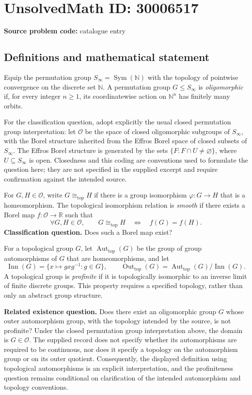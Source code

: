 \documentclass[11pt]{article}
\newcommand{\N}{\mathbb{N}}
\newcommand{\R}{\mathbb{R}}
\begin{document}
\section*{UnsolvedMath ID: 30006517}
\textbf{Source problem code:} catalogue entry
\subsection{Definitions and mathematical statement}
Equip the permutation group \(S_\infty=\operatorname{Sym}(\N)\) with the topology of pointwise convergence on the discrete set \(\N\). A permutation group \(G\leq S_\infty\) is \emph{oligomorphic} if, for every integer \(n\geq 1\), its coordinatewise action on \(\N^n\) has finitely many orbits.

For the classification question, adopt explicitly the usual closed permutation group interpretation: let \(\mathcal O\) be the space of closed oligomorphic subgroups of \(S_\infty\), with the Borel structure inherited from the Effros Borel space of closed subsets of \(S_\infty\). The Effros Borel structure is generated by the sets \(\{F:F\cap U\neq\varnothing\}\), where \(U\subseteq S_\infty\) is open. Closedness and this coding are conventions used to formulate the question here; they are not specified in the supplied excerpt and require confirmation against the intended source.

For \(G,H\in\mathcal O\), write \(G\cong_{\mathrm{top}}H\) if there is a group isomorphism \(\varphi:G\to H\) that is a homeomorphism. The topological isomorphism relation is \emph{smooth} if there exists a Borel map \(f:\mathcal O\to\R\) such that
\[
\forall G,H\in\mathcal O,\qquad
G\cong_{\mathrm{top}}H\quad\Longleftrightarrow\quad f(G)=f(H).
\]
\textbf{Classification question.} Does such a Borel map exist?

For a topological group \(G\), let \(\operatorname{Aut}_{\mathrm{top}}(G)\) be the group of group automorphisms of \(G\) that are homeomorphisms, and let
\[
\operatorname{Inn}(G)=\{x\mapsto gxg^{-1}:g\in G\},\qquad
\operatorname{Out}_{\mathrm{top}}(G)
=\operatorname{Aut}_{\mathrm{top}}(G)/\operatorname{Inn}(G).
\]
A topological group is \emph{profinite} if it is topologically isomorphic to an inverse limit of finite discrete groups. This property requires a specified topology, rather than only an abstract group structure.

\textbf{Related existence question.} Does there exist an oligomorphic group \(G\) whose outer automorphism group, with the topology intended by the source, is not profinite? Under the closed permutation group interpretation above, the domain is \(G\in\mathcal O\). The supplied record does not specify whether its automorphisms are required to be continuous, nor does it specify a topology on the automorphism group or on its outer quotient. Consequently, the displayed definition using topological automorphisms is an explicit interpretation, and the profiniteness question remains conditional on clarification of the intended automorphism and topology conventions.
\end{document}
